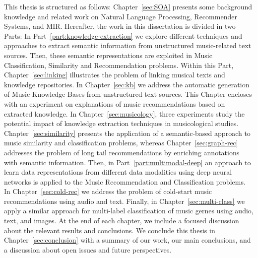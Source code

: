 This thesis is structured as follows: Chapter~\ref{sec:SOA} presents some background knowledge and related work on Natural Language Processing, Recommender Systems, and MIR. Hereafter, the work in this dissertation is divided in two Parts: In Part~\ref{part:knowledge-extraction} we explore different techniques and approaches to extract semantic information from unstructured music-related text sources. Then, these semantic representations are exploited in Music Classification, Similarity and Recommendation problems. Within this Part, Chapter~\ref{sec:linking} illustrates the problem of linking musical texts and knowledge repositories. In Chapter~\ref{sec:kb} we address the automatic generation of Music Knowledge Bases from unstructured text sources. This Chapter encloses with an experiment on explanations of music recommendations based on extracted knowledge. In Chapter~\ref{sec:musicology}, three experiments study the potential impact of knowledge extraction techniques in musicological studies.
Chapter~\ref{sec:similarity} presents the application of a semantic-based approach to music similarity and classification problems, whereas Chapter~\ref{sec:graph-rec} addresses the problem of long tail recommendations by enriching annotations with semantic information.
Then, in Part~\ref{part:multimodal-deep} an approach to learn data representations from different data modalities using deep neural networks is applied to the Music Recommendation and Classification problems. In Chapter~\ref{sec:cold-rec} we address the problem of cold-start music recommendations using audio and text. Finally, in Chapter~\ref{sec:multi-class} we apply a similar approach for multi-label classification of music gernes using audio, text, and images.
At the end of each chapter, we include a focused discussion about the relevant results and conclusions. We conclude this thesis in Chapter~\ref{sec:conclusion} with a summary of our work, our main conclusions, and a discussion about open issues and future perspectives.




